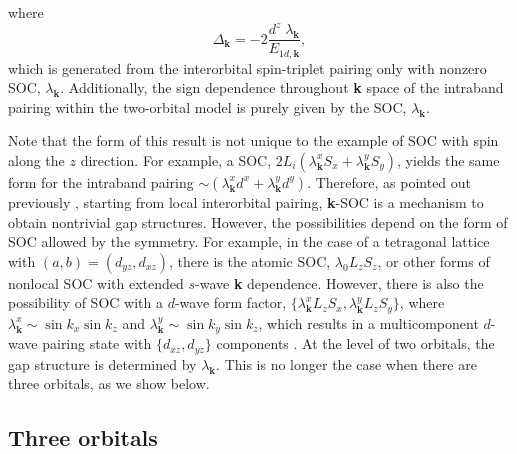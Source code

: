 \documentclass[%
reprint,
superscriptaddress,
 amsmath,amssymb,
 aps,
prb,
nobalancelastpage,
]{revtex4-2}
\begin{document}
where
\begin{equation}
\Delta_{\textbf{k}} =  -2\frac{d^{z}\;\lambda_{\textbf{k}}}{E_{1d,\textbf{k}}},
\end{equation}
which is generated from the interorbital spin-triplet pairing only with nonzero SOC, $\lambda_{\textbf{k}}$. Additionally, the sign dependence throughout \textbf{k} space of the intraband pairing within the two-orbital model is purely given by the SOC, $\lambda_{\textbf{k}}$. 



Note that the form of this result is not unique to the example of SOC with spin along the $z$ direction. For example, a SOC, $2L_{i}(\lambda_{\textbf{k}}^{x}S_{x} + \lambda_{\textbf{k}}^{y}S_{y})$, yields the same form for the intraband pairing $\sim (\lambda_{\textbf{k}}^{x}d^{x} + \lambda_{\textbf{k}}^{y}d^{y})$. Therefore, as pointed out previously \cite{Cheung2019PRB,Suh2019,clepkens2021}, starting from local interorbital pairing, \textbf{k}-SOC is a mechanism to obtain nontrivial gap structures. However, the possibilities depend on the form of SOC allowed by the symmetry. For example, in the case of a tetragonal lattice with $(a,b)=(d_{yz},d_{xz})$, there is the atomic SOC, $\lambda_{0}L_{z}S_{z}$, or other forms of nonlocal SOC with extended $s$-wave \textbf{k} dependence. However, there is also the possibility of SOC with a $d$-wave form factor, $\{\lambda_{\textbf{k}}^{x}L_{z}S_{x}, \lambda_{\textbf{k}}^{y}L_{z}S_{y}\}$, where $\lambda_{\textbf{k}}^{x}\sim \sin{k_{x}}\sin{k_{z}}$ and $\lambda_{\textbf{k}}^{y}\sim \sin{k_{y}}\sin{k_{z}}$, which results in a multicomponent $d$-wave pairing state with $\{d_{xz},d_{yz}\}$ components \cite{Cheung2019PRB}. At the level of two orbitals, the gap structure is determined by $\lambda_{\textbf{k}}$. This is no longer the case when there are three orbitals, as we show below.



\subsection{Three orbitals}
\end{document}
